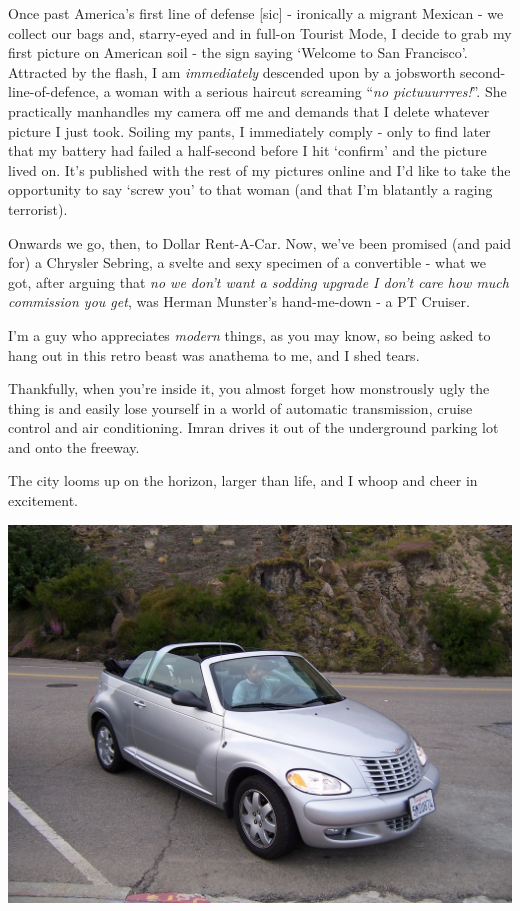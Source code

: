 \documentclass[a5paper,titlepage,11pt]{book}
\begin{document}
Once past America's first line of defense [sic] - ironically a migrant Mexican - we collect our bags and, starry-eyed and in full-on Tourist Mode, I decide to grab my first picture on American soil - the sign saying `Welcome to San Francisco'. Attracted by the flash, I am \emph{immediately} descended upon by a jobsworth second-line-of-defence, a woman with a serious haircut screaming ``\emph{no pictuuurrres!}''. She practically manhandles my camera off me and demands that I delete whatever picture I just took. Soiling my pants, I immediately comply - only to find later that my battery had failed a half-second before I hit `confirm' and the picture lived on. It's published with the rest of my pictures online and I'd like to take the opportunity to say `screw you' to that woman (and that I'm blatantly a raging terrorist).

Onwards we go, then, to Dollar Rent-A-Car. Now, we've been promised (and paid for) a Chrysler Sebring, a svelte and sexy specimen of a convertible - what we got, after arguing that \emph{no we don't want a sodding upgrade I don't care how much commission you get}, was Herman Munster's hand-me-down - a PT Cruiser.

I'm a guy who appreciates \emph{modern} things, as you may know, so being asked to hang out in this retro beast was anathema to me, and I shed tears.

Thankfully, when you're inside it, you almost forget how monstrously ugly the thing is and easily lose yourself in a world of automatic transmission, cruise control and air conditioning. Imran drives it out of the underground parking lot and onto the freeway.

The city looms up on the horizon, larger than life, and I whoop and cheer in excitement.

\begin{center}\includegraphics[width=\textwidth]{gfx/100_1064}\end{center}
\end{document}
